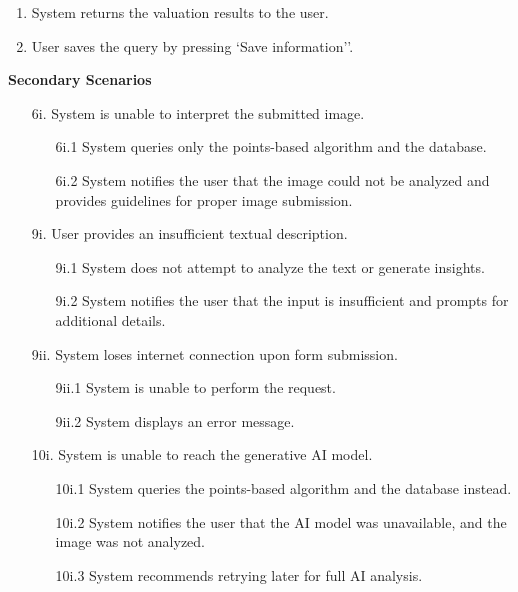 \documentclass[]{article}
\begin{document}
\begin{enumerate}[{\bf {BE}1.}]
\begin{enumerate}[1.]
      \item System returns the valuation results to the user.
      \item User saves the query by pressing `Save information''.
    \end{enumerate}
    \textbf{Secondary Scenarios}
    \begin{enumerate}
      \item[6i.] System is unable to interpret the submitted image.
      \begin{enumerate}
        \item[6i.1] System queries only the points-based algorithm and the database.
        \item[6i.2] System notifies the user that the image could not be analyzed and provides guidelines for proper image submission.
      \end{enumerate}
      \item[9i.] User provides an insufficient textual description.
      \begin{enumerate}
        \item[9i.1] System does not attempt to analyze the text or generate insights.
        \item[9i.2] System notifies the user that the input is insufficient and prompts for additional details.
      \end{enumerate}
      \item[9ii.] System loses internet connection upon form submission.
      \begin{enumerate}
        \item[9ii.1] System is unable to perform the request.
        \item[9ii.2] System displays an error message.
      \end{enumerate}
      \item[10i.] System is unable to reach the generative AI model.
      \begin{enumerate}
        \item[10i.1] System queries the points-based algorithm and the database instead.
        \item[10i.2] System notifies the user that the AI model was unavailable, and the image was not analyzed.
        \item[10i.3] System recommends retrying later for full AI analysis.
      \end{enumerate}
    \end{enumerate}


\end{enumerate}
\end{document}
